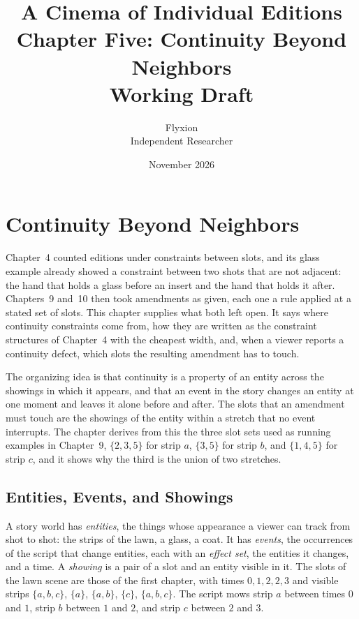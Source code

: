 \documentclass[11pt,twoside,openright]{book}
\title{\Huge\bfseries A Cinema of Individual Editions\\[1.2ex]
\large Chapter Five: Continuity Beyond Neighbors\\[0.4ex]
\large Working Draft}
\author{Flyxion\\[0.3ex]\small Independent Researcher}
\date{November 2026}
\theoremstyle{plain}
\theoremstyle{definition}
\theoremstyle{remark}
\begin{document}
\frontmatter
\maketitle
\tableofcontents
\mainmatter
\setcounter{chapter}{4}

\chapter{Continuity Beyond Neighbors}
\label{ch:continuity}

Chapter~4 counted editions under constraints between slots, and its glass example already showed a constraint between two shots that are not adjacent: the hand that holds a glass before an insert and the hand that holds it after. Chapters~9 and~10 then took amendments as given, each one a rule applied at a stated set of slots. This chapter supplies what both left open. It says where continuity constraints come from, how they are written as the constraint structures of Chapter~4 with the cheapest width, and, when a viewer reports a continuity defect, which slots the resulting amendment has to touch.

The organizing idea is that continuity is a property of an entity across the showings in which it appears, and that an event in the story changes an entity at one moment and leaves it alone before and after. The slots that an amendment must touch are the showings of the entity within a stretch that no event interrupts. The chapter derives from this the three slot sets used as running examples in Chapter~9, $\{2,3,5\}$ for strip $a$, $\{3,5\}$ for strip $b$, and $\{1,4,5\}$ for strip $c$, and it shows why the third is the union of two stretches.

\section{Entities, Events, and Showings}\label{sec:entities}

A story world has \emph{entities}, the things whose appearance a viewer can track from shot to shot: the strips of the lawn, a glass, a coat. It has \emph{events}, the occurrences of the script that change entities, each with an \emph{effect set}, the entities it changes, and a time. A \emph{showing} is a pair of a slot and an entity visible in it. The slots of the lawn scene are those of the first chapter, with times $0,1,2,2,3$ and visible strips $\{a,b,c\}$, $\{a\}$, $\{a,b\}$, $\{c\}$, $\{a,b,c\}$. The script mows strip $a$ between times $0$ and $1$, strip $b$ between $1$ and $2$, and strip $c$ between $2$ and $3$.
\end{document}
